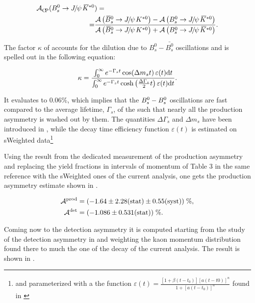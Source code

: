 \begin{align}
\centering
  \Acp\;(\BsJpsiKst&) = \nonumber \\
  = &\frac{\totAmp{\BsbarJpsiKst} - \totAmp{\BsJpsiKst}}{\totAmp{\BsbarJpsiKst} + \totAmp{\BsJpsiKst}}.
\label{acp_corrected_amps}
\end{align}

\noindent The factor $\kappa$ of  accounts for the dilution due to $B^0_s-\bar{B^0_s}$
oscillations \cite{LHCb-PAPER-2013-018} and is spelled out in the following equation:

\begin{equation}
  \centering
 \kappa = \frac{\int_0^\infty  e^{-\Gamma_s t} \cos \!\left( \Delta m_s t \right ) \varepsilon(t)\mathrm{d}t}{\int_0^\infty  e^{-\Gamma_s t} \cosh \left( \frac{\Delta \Gamma_s}{2} t \right ) \varepsilon(t)\mathrm{d}t}.
\label{kappa}
\end{equation}

\noindent It evaluates to $0.06\%$, which implies that the $B^0_s-B^0_s$ oscillations are fast compared to the
average lifetime, $\Gamma_s$, of the \BBbarSyst such that nearly all the production asymmetry is washed out by them.
The quantities $\Delta\Gamma_s$ and $\Delta m_s$ have been introduced in ,
while the decay time efficiency function $\varepsilon(t)$ is estimated on sWeighted \BsJpsiKst
data\footnote{and parameterized with a the function $\varepsilon(t)= \frac{[1+\beta(t-t_0)][a(t-t0)]^n}{1+[a(t-t_0)]^n}$ found in \cite{LHCb-PAPER-2014-053}}

Using the result from the dedicated \lhcb measurement of the production asymmetry \cite{LHCb-PAPER-2014-042}
and replacing the yield fractions in intervals of \Bs momentum of Table 3 in the same reference with the sWeighted \BsJpsiKst ones of the current analysis,
one gets the production asymmetry estimate shown in .

\begin{subequations}
  \label{exp_assym}
  \begin{align}
    \centering
    \Aprod &= (-1.64 \pm 2.28 \stat \pm 0.55 \syst) \;\%, \label{prod_assym} \\
    \Adet  &= (-1.086 \pm 0.531 \stat) \;\%. \label{det_assym}
  \end{align}
\end{subequations}

\noindent Coming now to the detection asymmetry it is computed starting from the \lhcb study of the detection asymmetry
in \cite{LHCb-PAPER-2014-013} and weighting the kaon momentum distribution found there to much the one of the \BsJpsiKst
decay of the current analysis. The result is shown in .

